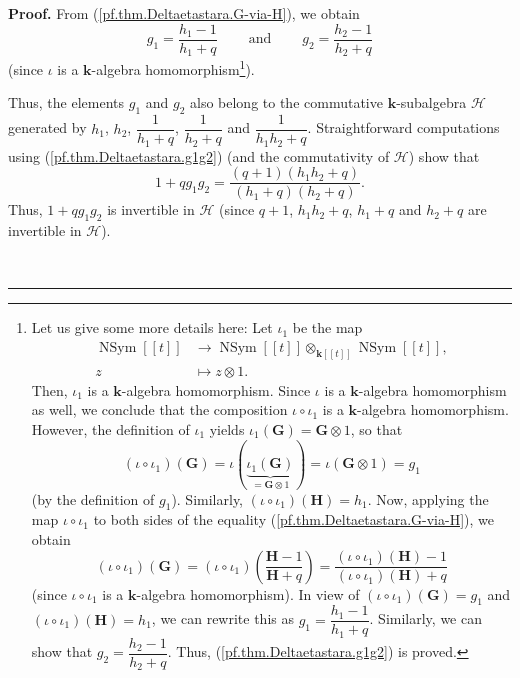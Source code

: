 \documentclass[numbers=enddot,12pt,final,onecolumn,notitlepage]{scrartcl}%
\theoremstyle{definition}
\newenvironment{proof}[1][Proof]{\noindent\textbf{#1.} }{\ \rule{0.5em}{0.5em}}
\begin{document}
\begin{proof}
From (\ref{pf.thm.Deltaetastara.G-via-H}), we obtain
\begin{equation}
g_{1}=\dfrac{h_{1}-1}{h_{1}+q}\ \ \ \ \ \ \ \ \ \ \text{and}%
\ \ \ \ \ \ \ \ \ \ g_{2}=\dfrac{h_{2}-1}{h_{2}+q}
\label{pf.thm.Deltaetastara.g1g2}%
\end{equation}
(since $\iota$ is a $\mathbf{k}$-algebra homomorphism\footnote{Let us give
some more details here: Let $\iota_{1}$ be the map
\begin{align*}
\operatorname*{NSym}\left[  \left[  t\right]  \right]   &  \rightarrow
\operatorname*{NSym}\left[  \left[  t\right]  \right]  \otimes_{\mathbf{k}%
\left[  \left[  t\right]  \right]  }\operatorname*{NSym}\left[  \left[
t\right]  \right]  ,\\
z  &  \mapsto z\otimes1.
\end{align*}
Then, $\iota_{1}$ is a $\mathbf{k}$-algebra homomorphism. Since $\iota$ is a
$\mathbf{k}$-algebra homomorphism as well, we conclude that the composition
$\iota\circ\iota_{1}$ is a $\mathbf{k}$-algebra homomorphism. However, the
definition of $\iota_{1}$ yields $\iota_{1}\left(  \mathbf{G}\right)
=\mathbf{G}\otimes1$, so that
\[
\left(  \iota\circ\iota_{1}\right)  \left(  \mathbf{G}\right)  =\iota\left(
\underbrace{\iota_{1}\left(  \mathbf{G}\right)  }_{=\mathbf{G}\otimes
1}\right)  =\iota\left(  \mathbf{G}\otimes1\right)  =g_{1}%
\]
(by the definition of $g_{1}$). Similarly, $\left(  \iota\circ\iota
_{1}\right)  \left(  \mathbf{H}\right)  =h_{1}$. Now, applying the map
$\iota\circ\iota_{1}$ to both sides of the equality
(\ref{pf.thm.Deltaetastara.G-via-H}), we obtain%
\[
\left(  \iota\circ\iota_{1}\right)  \left(  \mathbf{G}\right)  =\left(
\iota\circ\iota_{1}\right)  \left(  \dfrac{\mathbf{H}-1}{\mathbf{H}+q}\right)
=\dfrac{\left(  \iota\circ\iota_{1}\right)  \left(  \mathbf{H}\right)
-1}{\left(  \iota\circ\iota_{1}\right)  \left(  \mathbf{H}\right)  +q}%
\]
(since $\iota\circ\iota_{1}$ is a $\mathbf{k}$-algebra homomorphism). In view
of $\left(  \iota\circ\iota_{1}\right)  \left(  \mathbf{G}\right)  =g_{1}$ and
$\left(  \iota\circ\iota_{1}\right)  \left(  \mathbf{H}\right)  =h_{1}$, we
can rewrite this as $g_{1}=\dfrac{h_{1}-1}{h_{1}+q}$. Similarly, we can show
that $g_{2}=\dfrac{h_{2}-1}{h_{2}+q}$. Thus, (\ref{pf.thm.Deltaetastara.g1g2})
is proved.}).

Thus, the elements $g_{1}$ and $g_{2}$ also belong to the commutative
$\mathbf{k}$-subalgebra $\mathcal{H}$ generated by $h_{1}$, $h_{2}$,
$\dfrac{1}{h_{1}+q}$, $\dfrac{1}{h_{2}+q}$ and $\dfrac{1}{h_{1}h_{2}+q}$.
Straightforward computations using (\ref{pf.thm.Deltaetastara.g1g2}) (and the
commutativity of $\mathcal{H}$) show that%
\[
1+qg_{1}g_{2}=\dfrac{\left(  q+1\right)  \left(  h_{1}h_{2}+q\right)
}{\left(  h_{1}+q\right)  \left(  h_{2}+q\right)  }.
\]
Thus, $1+qg_{1}g_{2}$ is invertible in $\mathcal{H}$ (since $q+1$, $h_{1}%
h_{2}+q$, $h_{1}+q$ and $h_{2}+q$ are invertible in $\mathcal{H}$).


\end{proof}
\end{document}
